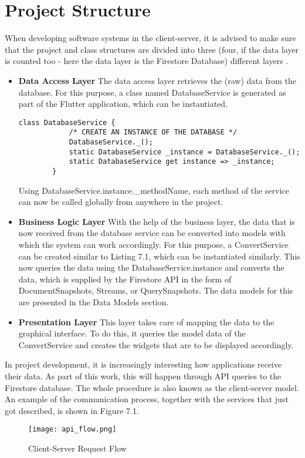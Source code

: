 \section{Project Structure}
When developing software systems in the client-server, it is advised to make sure that the project and class structures are divided into three (four, if the data layer is counted too - here the data layer is the Firestore Database) different layers \cite[p. 175]{.3layer}.
\begin{itemize}
	\item \textbf{Data Access Layer}
	\newline
	The data access layer retrieves the (raw) data from the database. For this purpose, a class named DatabaseService is generated as part of the Flutter application, which can be instantiated.
	\scriptsize
	\begin{lstlisting}[caption=Stepper for Body Part Selection]
		class DatabaseService {
			/* CREATE AN INSTANCE OF THE DATABASE */
			DatabaseService._();
			static DatabaseService _instance = DatabaseService._();
			static DatabaseService get instance => _instance;
		}
	\end{lstlisting}
	\normalsize
	Using DatabaseService.instance.\_methodName, each method of the service can now be called globally from anywhere in the project.
	\item \textbf{Business Logic Layer}
	\newline
	With the help of the business layer, the data that is now received from the database service can be converted into models with which the system can work accordingly. For this purpose, a ConvertService can be created similar to Listing 7.1, which can be instantiated similarly. This now queries the data using the DatabaseService.instance and converts the data, which is supplied by the Firestore API in the form of DocumentSnapshots, Streams, or QuerySnapshots. The data models for this are presented in the Data Models section.
	\item \textbf{Presentation Layer}
	\newline
	This layer takes care of mapping the data to the graphical interface. To do this, it queries the model data of the ConvertService and creates the widgets that are to be displayed accordingly.
\end{itemize}
In project development, it is increasingly interesting how applications receive their data. As part of this work, this will happen through API queries to the Firestore database. The whole procedure is also known as the client-server model. An example of the communication process, together with the services that just got described, is shown in Figure 7.1. 
\begin{figure}[H]
	\centering
	\texttt{[image: api\_flow.png]}
	\caption[Client-Server Request Flow]{Client-Server Request Flow}
\end{figure}
\noindent
